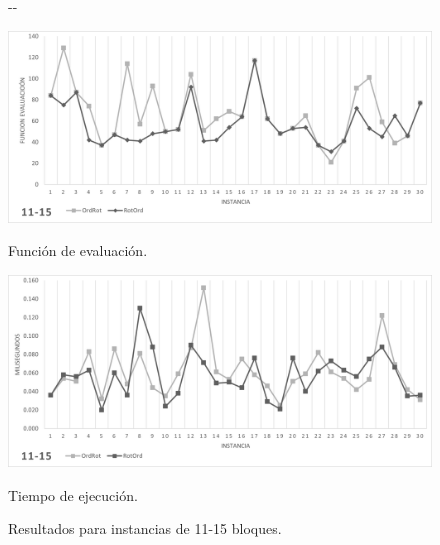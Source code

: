 \documentclass[letter, 10pt]{article}
\begin{document}
\begin{figure}[H]
    \begin{adjustwidth}{-\marginparwidth}{-\marginparwidth}
        \centering
        \begin{minipage}{.5\linewidth}
            \centering
            \includegraphics[width=\linewidth]{./img/11-15.png}
            \caption*{Función de evaluación.}
            \label{fig:11-15_g}
        \end{minipage}%
        \begin{minipage}{.5\linewidth}
            \centering
            \includegraphics[width=\linewidth]{./img/11-15_t.png}
            \caption*{Tiempo de ejecución.}
            \label{fig:11-15_t}
        \end{minipage}
    \end{adjustwidth}
    \caption{Resultados para instancias de 11-15 bloques.}
    \label{fig:11-15}
\end{figure}
\end{document}
